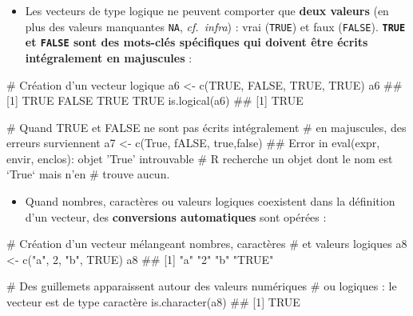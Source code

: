 \documentclass[12pt,twosided, notitlepage]{book}
\newenvironment{Shaded}{}{}
\newcommand{\KeywordTok}[1]{\textcolor[rgb]{0.00,0.00,1.00}{{#1}}}
\newcommand{\DecValTok}[1]{{#1}}
\newcommand{\StringTok}[1]{\textcolor[rgb]{0.00,0.50,0.50}{{#1}}}
\newcommand{\CommentTok}[1]{\textcolor[rgb]{0.00,0.50,0.00}{{#1}}}
\newcommand{\OtherTok}[1]{\textcolor[rgb]{1.00,0.25,0.00}{{#1}}}
\newcommand{\NormalTok}[1]{{#1}}
\providecommand{\tightlist}{%
  \setlength{\itemsep}{0pt}\setlength{\parskip}{0pt}}
\renewenvironment{Shaded}{\begin{snugshade}}{\end{snugshade}}
\begin{document}
\begin{itemize}
\tightlist
\item
  Les vecteurs de type logique ne peuvent comporter que \textbf{deux
  valeurs} (en plus des valeurs manquantes \texttt{NA},
  \emph{cf.~infra}) : vrai (\texttt{TRUE}) et faux (\texttt{FALSE}).
  \textbf{\texttt{TRUE} et \texttt{FALSE} sont des mots-clés spécifiques
  qui doivent être écrits intégralement en majuscules} :
\end{itemize}

\begin{Shaded}
\begin{Highlighting}[]
\CommentTok{# Création d'un vecteur logique}
\NormalTok{a6 <-}\StringTok{ }\KeywordTok{c}\NormalTok{(}\OtherTok{TRUE}\NormalTok{, }\OtherTok{FALSE}\NormalTok{, }\OtherTok{TRUE}\NormalTok{, }\OtherTok{TRUE}\NormalTok{)}
\NormalTok{a6}
  \NormalTok{## [1]  TRUE FALSE  TRUE  TRUE}
\KeywordTok{is.logical}\NormalTok{(a6)}
  \NormalTok{## [1] TRUE}

\CommentTok{# Quand TRUE et FALSE ne sont pas écrits intégralement }
\CommentTok{# en majuscules, des erreurs surviennent}
\NormalTok{a7 <-}\StringTok{ }\KeywordTok{c}\NormalTok{(True, fALSE, true,false)}
  \NormalTok{## Error in eval(expr, envir, enclos): objet 'True' introuvable}
\CommentTok{# R recherche un objet dont le nom est `True` mais n'en }
\CommentTok{# trouve aucun.}
\end{Highlighting}
\end{Shaded}

\begin{itemize}
\tightlist
\item
  Quand nombres, caractères ou valeurs logiques coexistent dans la
  définition d'un vecteur, des \textbf{conversions automatiques} sont
  opérées :
\end{itemize}

\begin{Shaded}
\begin{Highlighting}[]
\CommentTok{# Création d'un vecteur mélangeant nombres, caractères}
\CommentTok{# et valeurs logiques}
\NormalTok{a8 <-}\StringTok{ }\KeywordTok{c}\NormalTok{(}\StringTok{"a"}\NormalTok{, }\DecValTok{2}\NormalTok{, }\StringTok{"b"}\NormalTok{, }\OtherTok{TRUE}\NormalTok{)}
\NormalTok{a8}
  \NormalTok{## [1] "a"    "2"    "b"    "TRUE"}

\CommentTok{# Des guillemets apparaissent autour des valeurs numériques}
\CommentTok{# ou logiques : le vecteur est de type caractère}
\KeywordTok{is.character}\NormalTok{(a8)}
  \NormalTok{## [1] TRUE}
\end{Highlighting}
\end{Shaded}
\end{document}
